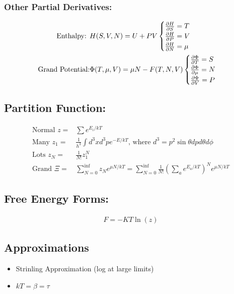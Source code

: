\subsubsection*{Other Partial Derivatives:}

\begin{align}
	\text{Enthalpy: }       & H(S, V, N) = U + PV
	\begin{cases}
		\pdv{H}{S} = T   \\
		\pdv{H}{P} = V   \\
		\pdv{H}{N} = \mu \\
	\end{cases}                                               \\
	\text{Grand Potential:} & \Phi(T, \mu, V) = \mu N - F(T, N, V)
	\begin{cases}
		\pdv{\Phi}{T} = S   \\
		\pdv{\Phi}{\mu} = N \\
		\pdv{\Phi}{V} = P   \\
	\end{cases}
\end{align}


\subsection*{Partition Function:}

\begin{align}
	\text{Normal  } z = & \sum e^{E_i / kT}                                                                                            \\
	\text{Many } z_1 =  & \frac{1}{h^3} \int d^3x d^3p e^{-E/ kT}\text{, where } d^3 = p^2\sin\theta dp d\theta d\phi                  \\
	\text{Lots } z_N =  & \frac{1}{N!} z_1^N                                                                                           \\
	\text{Grand } \Xi = & \sum_{N=0}^{\inf} z_N e^{\mu N / kT} = \sum_{N=0}^{\inf} \frac{1}{N!} (\sum_a e^{E_a / kT})^N e^{\mu N / kT}
\end{align}


\subsection*{Free Energy Forms:}
\begin{align}
	F = - KT \ln(z)
\end{align}

\subsection*{Approximations}

\begin{itemize}
	\item Strinling Approximation (log at large limits)
	\item $k T = \beta = \tau$
\end{itemize}

